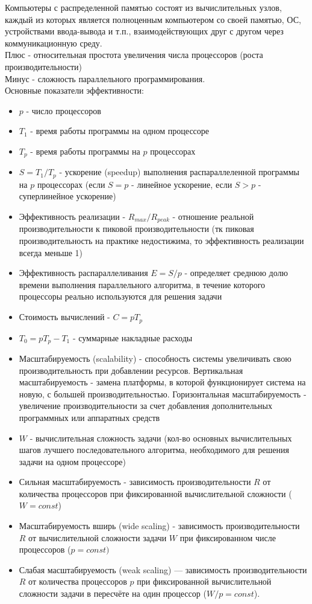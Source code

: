 Компьютеры с распределенной памятью состоят из вычислительных узлов, каждый из которых является полноценным компьютером со своей памятью, ОС, устройствами ввода-вывода и т.п., взаимодействующих друг с другом через коммуникационную среду.\\
Плюс - относительная простота увеличения числа процессоров (роста производительности)\\
Минус - сложность параллельного программирования.\\

Основные показатели эффективности:\\
\begin{itemize}
    \item $p$ - число процессоров
    \item $T_{1}$ - время работы программы на одном процессоре
    \item $T_{p}$ - время работы программы на $p$ процессорах
    \item $S = T_{1} / T_{p}$ - ускорение (speedup) выполнения распараллеленной программы на $p$ процессорах (если $S = p$ - линейное ускорение, если $S > p$ - суперлинейное ускорение)
    \item Эффективность реализации - $R_{max} / R_{peak}$ - отношение реальной производительности к пиковой производительности (тк пиковая производительность на практике недостижима, то эффективность реализации всегда меньше 1)
    \item Эффективность распараллеливания $E = S / p$ - определяет среднюю долю времени выполнения параллельного алгоритма, в течение которого процессоры реально используются для решения задачи
    \item Стоимость вычислений - $C = pT_{p}$
    \item $T_{0} = pT_{p} - T_{1}$ - суммарные накладные расходы
    \item Масштабируемость (scalability) - способность системы увеличивать свою производительность при добавлении ресурсов. Вертикальная масштабируемость - замена платформы, в которой функционирует система на новую, с большей производительностью. Горизонтальная масштабируемость - увеличение производительности за счет добавления дополнительных программных или аппаратных средств
    \item $W$ - вычислительная сложность задачи (кол-во основных вычислительных шагов лучшего последовательного алгоритма, необходимого для решения задачи на одном процессоре)
    \item Сильная масштабируемость - зависимость производительности $R$ от количества процессоров при фиксированной вычислительной сложности ($W = const$)
    \item Масштабируемость вширь (wide scaling) - зависимость производительности $R$ от вычислительной сложности задачи $W$ при фиксированном числе процессоров ($p = const)$
    \item Слабая масштабируемость (weak scaling) — зависимость производительности $R$ от количества процессоров $p$ при фиксированной вычислительной сложности задачи в пересчёте на один процессор ($W/p = const$).
\end{itemize}

